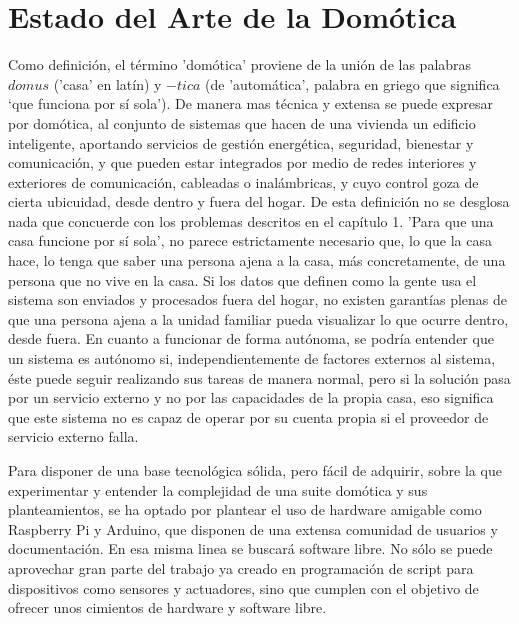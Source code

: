 \cleardoublepage

\chapter{Estado del Arte de la Domótica}
\label{ch:Capitulo2}

Como definición, el término 'domótica' proviene de la unión de las palabras $domus$ ('casa' en latín) y $-tica$ (de 'automática', palabra en griego que significa ‘que funciona por sí sola’). De manera mas técnica y extensa se puede expresar por domótica, al conjunto de sistemas que hacen de una vivienda un edificio inteligente, aportando servicios de gestión energética, seguridad, bienestar y comunicación, y que pueden estar integrados por medio de redes interiores y exteriores de comunicación, cableadas o inalámbricas, y cuyo control goza de cierta ubicuidad, desde dentro y fuera del hogar. De esta definición no se desglosa nada que concuerde con los problemas descritos en el capítulo 1. 'Para que una casa funcione por sí sola', no parece estrictamente necesario que, lo que la casa hace, lo tenga que saber una persona ajena a la casa, más concretamente, de una persona que no vive en la casa. Si los datos que definen como la gente usa el sistema son enviados y procesados fuera del hogar, no existen garantías plenas de que una persona ajena a la unidad familiar pueda visualizar lo que ocurre dentro, desde fuera. En cuanto a funcionar de forma autónoma, se podría entender que un sistema es autónomo si, independientemente de factores externos al sistema, éste puede seguir realizando sus tareas de manera normal, pero si la solución pasa por un servicio externo y no por las capacidades de la propia casa, eso significa que este sistema no es capaz de operar por su cuenta propia si el proveedor de servicio externo falla.

\vspace{1cm}

Para disponer de una base tecnológica sólida, pero fácil de adquirir, sobre la que experimentar y entender la complejidad de una suite domótica y sus planteamientos, se ha optado por plantear el uso de hardware amigable como Raspberry Pi y Arduino, que disponen de una extensa comunidad de usuarios y documentación. En esa misma linea se buscará software libre. No sólo se puede aprovechar gran parte del trabajo ya creado en programación de \gls{script} para dispositivos como sensores y actuadores, sino que cumplen con el objetivo de ofrecer unos cimientos de hardware y software libre.


